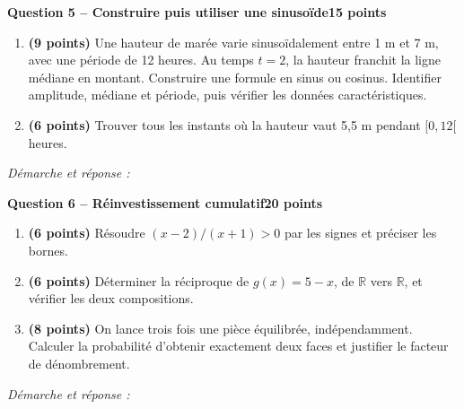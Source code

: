 \documentclass[11pt,a4paper]{article}
\begin{document}
\newpage
{\large\bfseries Question 5 -- Construire puis utiliser une sinusoïde}\hfill\textbf{15 points}\par
\begin{enumerate}
\item \textbf{(9 points)} Une hauteur de marée varie sinusoïdalement entre 1 m et 7 m, avec une période de 12 heures. Au temps \(t=2\), la hauteur franchit la ligne médiane en montant. Construire une formule en sinus ou cosinus. Identifier amplitude, médiane et période, puis vérifier les données caractéristiques.
\item \textbf{(6 points)} Trouver tous les instants où la hauteur vaut 5,5 m pendant \([0,12[\) heures.
\end{enumerate}
\vspace{3mm}\textit{Démarche et réponse :}\par\vfill

\newpage
{\large\bfseries Question 6 -- Réinvestissement cumulatif}\hfill\textbf{20 points}\par
\begin{enumerate}
\item \textbf{(6 points)} Résoudre \((x-2)/(x+1)>0\) par les signes et préciser les bornes.
\item \textbf{(6 points)} Déterminer la réciproque de \(g(x)=5-x\), de \(\mathbb R\) vers \(\mathbb R\), et vérifier les deux compositions.
\item \textbf{(8 points)} On lance trois fois une pièce équilibrée, indépendamment. Calculer la probabilité d’obtenir exactement deux faces et justifier le facteur de dénombrement.
\end{enumerate}
\vspace{3mm}\textit{Démarche et réponse :}\par\vfill
\end{document}
